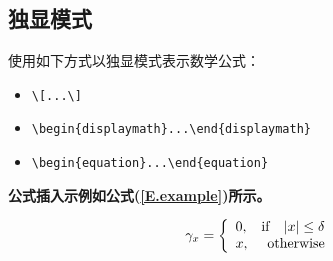 \subsection{独显模式}

使用如下方式以独显模式表示数学公式：

\begin{itemize}
    \item \verb|\[...\]|
    \item \verb|\begin{displaymath}...\end{displaymath}|
    \item \verb|\begin{equation}...\end{equation}|
\end{itemize}

\textbf{公式插入示例如公式(\ref{E.example})所示。}

\begin{equation}
\gamma_{x}=
\left\{
  \begin{array}{lr}
  0, & {\rm if}~~\;|x| \leq \delta \\
  x, & {\rm otherwise}
  \end{array}
\right.
\label{E.example}
\end{equation}


\newpage

